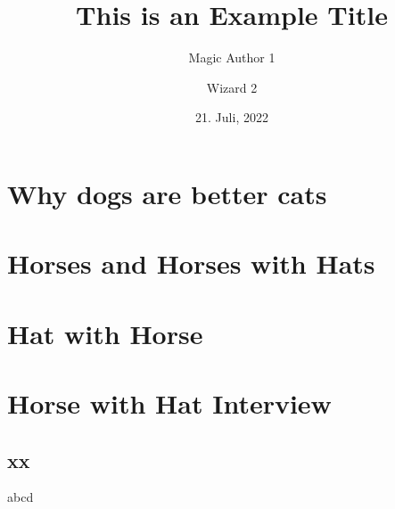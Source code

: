 \documentclass[a3paper, protrait, ngerman]{uulm-cs-poster}
\title{This is an Example Title}
\author{Magic Author 1\and Wizard 2}
\date{21. Juli, 2022}
\begin{document}
\maketitle
\section*{Why dogs are better cats}
\lipsum[2]
\begin{multicols}{3}
\section*{Horses and Horses with Hats}
   \lipsum[1-4]
\section*{Hat with Horse}
   \lipsum[4-7]
\end{multicols}
\lipsum[2]
\section*{Horse with Hat Interview}
\begin{multicols}{4}
   \lipsum[2]
   \subsection*{xx}
   abcd
\end{multicols}
\end{document}
